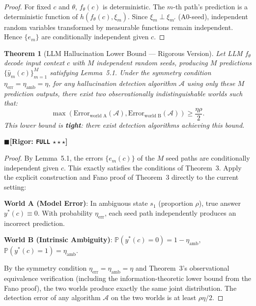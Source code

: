 \documentclass[12pt,a4paper]{article}
\newtheorem{theorem}{Theorem}[section]
\theoremstyle{definition}
\theoremstyle{remark}
\newcommand{\rigorFull}{$\blacksquare$\;\textbf{[Rigor: \texttt{FULL} $\star\star\star$]}}
\begin{document}
\begin{proof}
For fixed $c$ and $\theta$, $f_\theta(c)$ is deterministic. The $m$-th path's prediction is a deterministic function of $h(f_\theta(c), \xi_m)$. Since $\xi_m \perp \xi_{m'}$ (A0-seed), independent random variables transformed by measurable functions remain independent. Hence $\{e_m\}$ are conditionally independent given $c$.
\end{proof}

\begin{theorem}[LLM Hallucination Lower Bound --- Rigorous Version]
\label{thm:5.1}
Let LLM $f_\theta$ decode input context $c$ with $M$ independent random seeds, producing $M$ predictions $\{\hat{y}_m(c)\}_{m=1}^M$ satisfying Lemma~5.1. Under the symmetry condition $\eta_{\text{err}} = \eta_{\text{amb}} = \eta$, for any hallucination detection algorithm $\mathcal{A}$ using only these $M$ prediction outputs, there exist two observationally indistinguishable worlds such that:
\begin{equation}
\boxed{\max\left(\text{Error}_{\text{world A}}(\mathcal{A}), \text{Error}_{\text{world B}}(\mathcal{A})\right) \geq \frac{\eta\rho}{2}}.
\end{equation}
This lower bound is \textbf{tight}: there exist detection algorithms achieving this bound.
\end{theorem}
\rigorFull

\begin{proof}
By Lemma~5.1, the errors $\{e_m(c)\}$ of the $M$ seed paths are conditionally independent given $c$. This exactly satisfies the conditions of Theorem~3. Apply the explicit construction and Fano proof of Theorem~3 directly to the current setting:

\textbf{World A (Model Error)}: In ambiguous state $s_1$ (proportion $\rho$), true answer $y^*(c) \equiv 0$. With probability $\eta_{\text{err}}$, each seed path independently produces an incorrect prediction.

\textbf{World B (Intrinsic Ambiguity)}: $\mathbb{P}(y^*(c)=0) = 1-\eta_{\text{amb}}$, $\mathbb{P}(y^*(c)=1) = \eta_{\text{amb}}$.

By the symmetry condition $\eta_{\text{err}} = \eta_{\text{amb}} = \eta$ and Theorem~3's observational equivalence verification (including the information-theoretic lower bound from the Fano proof), the two worlds produce exactly the same joint distribution. The detection error of any algorithm $\mathcal{A}$ on the two worlds is at least $\rho\eta/2$.
\end{proof}
\end{document}
